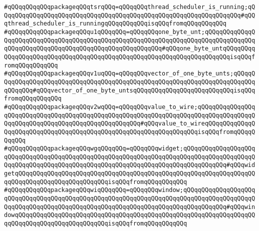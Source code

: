 \verb|#qQQqqQQqqQQqpackageqQQqtsrqQQq=qQQqqQQqthread_scheduler_is_running;qQQqqQQqqQQqqQQqqQQqqQQqqQQqqQQqqQQqqQQqqQQqqQQqqQQqqQQqqQQqqQQqqQQq#qQQqthread_scheduler_is_runningqQQqqQQqqQQqisqQQqfromqQQqqQQqqQQq|\newline
\verb|#qQQqqQQqqQQqpackageqQQqu1qQQqqQQq=qQQqqQQqone_byte_unt;qQQqqQQqqQQqqQQqqQQqqQQqqQQqqQQqqQQqqQQqqQQqqQQqqQQqqQQqqQQqqQQqqQQqqQQqqQQqqQQqqQQqqQQqqQQqqQQqqQQqqQQqqQQqqQQqqQQqqQQqqQQqqQQq#qQQqone_byte_untqQQqqQQqqQQqqQQqqQQqqQQqqQQqqQQqqQQqqQQqqQQqqQQqqQQqqQQqqQQqqQQqqQQqqQQqisqQQqfromqQQqqQQqqQQq|\newline
\verb|#qQQqqQQqqQQqpackageqQQqv1uqQQq=qQQqqQQqvector_of_one_byte_unts;qQQqqQQqqQQqqQQqqQQqqQQqqQQqqQQqqQQqqQQqqQQqqQQqqQQqqQQqqQQqqQQqqQQqqQQqqQQqqQQqqQQq#qQQqvector_of_one_byte_untsqQQqqQQqqQQqqQQqqQQqqQQqqQQqisqQQqfromqQQqqQQqqQQq|\newline
\verb|#qQQqqQQqqQQqpackageqQQqv2wqQQq=qQQqqQQqvalue_to_wire;qQQqqQQqqQQqqQQqqQQqqQQqqQQqqQQqqQQqqQQqqQQqqQQqqQQqqQQqqQQqqQQqqQQqqQQqqQQqqQQqqQQqqQQqqQQqqQQqqQQqqQQqqQQqqQQqqQQqqQQqqQQq#qQQqvalue_to_wireqQQqqQQqqQQqqQQqqQQqqQQqqQQqqQQqqQQqqQQqqQQqqQQqqQQqqQQqqQQqqQQqqQQqisqQQqfromqQQqqQQqqQQq|\newline
\verb|#qQQqqQQqqQQqpackageqQQqwgqQQqqQQq=qQQqqQQqwidget;qQQqqQQqqQQqqQQqqQQqqQQqqQQqqQQqqQQqqQQqqQQqqQQqqQQqqQQqqQQqqQQqqQQqqQQqqQQqqQQqqQQqqQQqqQQqqQQqqQQqqQQqqQQqqQQqqQQqqQQqqQQqqQQqqQQqqQQqqQQqqQQqqQQqqQQq#qQQqwidgetqQQqqQQqqQQqqQQqqQQqqQQqqQQqqQQqqQQqqQQqqQQqqQQqqQQqqQQqqQQqqQQqqQQqqQQqqQQqqQQqqQQqqQQqqQQqqQQqisqQQqfromqQQqqQQqqQQq|\newline
\verb|#qQQqqQQqqQQqpackageqQQqwiqQQqqQQq=qQQqqQQqwindow;qQQqqQQqqQQqqQQqqQQqqQQqqQQqqQQqqQQqqQQqqQQqqQQqqQQqqQQqqQQqqQQqqQQqqQQqqQQqqQQqqQQqqQQqqQQqqQQqqQQqqQQqqQQqqQQqqQQqqQQqqQQqqQQqqQQqqQQqqQQqqQQqqQQqqQQq#qQQqwindowqQQqqQQqqQQqqQQqqQQqqQQqqQQqqQQqqQQqqQQqqQQqqQQqqQQqqQQqqQQqqQQqqQQqqQQqqQQqqQQqqQQqqQQqqQQqqQQqisqQQqfromqQQqqQQqqQQq|\newline
